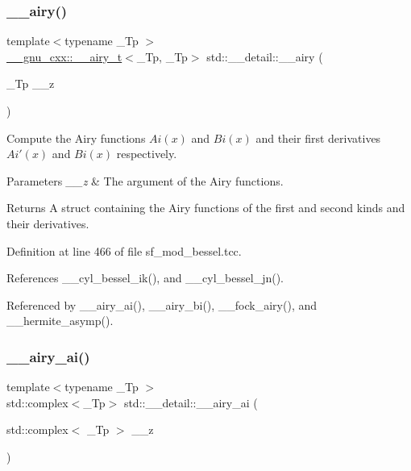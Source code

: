 \subsubsection{\texorpdfstring{\+\_\+\+\_\+airy()}{\_\_airy()}}
{\footnotesize\ttfamily template$<$typename \+\_\+\+Tp $>$ \\
\hyperlink{struct____gnu__cxx_1_1____airy__t}{\+\_\+\+\_\+gnu\+\_\+cxx\+::\+\_\+\+\_\+airy\+\_\+t}$<$\+\_\+\+Tp, \+\_\+\+Tp$>$ std\+::\+\_\+\+\_\+detail\+::\+\_\+\+\_\+airy (\begin{DoxyParamCaption}\item[{\+\_\+\+Tp}]{\+\_\+\+\_\+z }\end{DoxyParamCaption})}



Compute the Airy functions $ Ai(x) $ and $ Bi(x) $ and their first derivatives $ Ai'(x) $ and $ Bi(x) $ respectively. 


\begin{DoxyParams}{Parameters}
{\em \+\_\+\+\_\+z} & The argument of the Airy functions. \\
\hline
\end{DoxyParams}
\begin{DoxyReturn}{Returns}
A struct containing the Airy functions of the first and second kinds and their derivatives. 
\end{DoxyReturn}


Definition at line 466 of file sf\+\_\+mod\+\_\+bessel.\+tcc.



References \+\_\+\+\_\+cyl\+\_\+bessel\+\_\+ik(), and \+\_\+\+\_\+cyl\+\_\+bessel\+\_\+jn().



Referenced by \+\_\+\+\_\+airy\+\_\+ai(), \+\_\+\+\_\+airy\+\_\+bi(), \+\_\+\+\_\+fock\+\_\+airy(), and \+\_\+\+\_\+hermite\+\_\+asymp().

\mbox{\label{namespacestd_1_1____detail_afd48b5702344f832a250922ac4ffb917}} 
\subsubsection{\texorpdfstring{\+\_\+\+\_\+airy\+\_\+ai()}{\_\_airy\_ai()}}
{\footnotesize\ttfamily template$<$typename \+\_\+\+Tp $>$ \\
std\+::complex$<$\+\_\+\+Tp$>$ std\+::\+\_\+\+\_\+detail\+::\+\_\+\+\_\+airy\+\_\+ai (\begin{DoxyParamCaption}\item[{std\+::complex$<$ \+\_\+\+Tp $>$}]{\+\_\+\+\_\+z }\end{DoxyParamCaption})}



